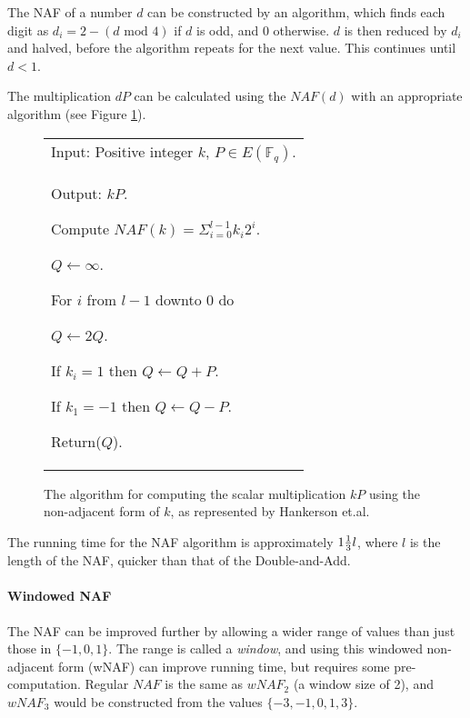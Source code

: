 The NAF of a number \(d\) can be constructed by an algorithm, which finds each digit as \(d_i = 2 - (d \text{ mod } 4)\) if \(d\) is odd, and
\(0\) otherwise. \(d\) is then reduced by \(d_i\) and halved, before the algorithm repeats for the next value. This continues until \(d < 1\).

The multiplication \(dP\) can be calculated using the \(NAF(d)\) with an appropriate algorithm (see Figure \ref{fig:naf-algorithm}).\cite{hankerson2010}

\begin{figure}[htb!]
	\centering
	\begin{tabular}{|p{\textwidth}|}
		\hline
		Input: Positive integer \(k\), \(P \in E(\mathbb{F}_q)\). \\
		Output: \(kP\).

		\begin{enumerate*}
			\item Compute \(NAF(k) = \Sigma^{l-1}_{i=0} k_i2^i\).
			\item \(Q \gets \infty\).
			\item For \(i\) from \(l-1\) downto \(0\) do
			\begin{enumerate*}
				\item \(Q \gets 2Q\).
				\item If \(k_i = 1\) then \(Q \gets Q + P\).
				\item If \(k_1 = -1\) then \(Q \gets Q - P\).
			\end{enumerate*}
			\item Return(\(Q\)).
		\end{enumerate*}
		\\
		\hline
	\end{tabular}
	\caption{The algorithm for computing the scalar multiplication \(kP\) using the non-adjacent form of \(k\), as represented by
		Hankerson et.al.\cite{hankerson2010}}
	\label{fig:naf-algorithm}
\end{figure}

The running time for the NAF algorithm is approximately \(1 {1 \over 3} l\), where \(l\) is the length of the NAF, quicker than that
of the Double-and-Add.\cite{hankerson2010}

\paragraph{Windowed NAF}

The NAF can be improved further by allowing a wider range of values than just those in \(\{-1,0,1\}\). The range is called a \emph{window}, and
using this windowed non-adjacent form (wNAF) can improve running time, but requires some pre-computation. Regular \(NAF\) is the same
as \(wNAF_2\) (a window size of 2), and \(wNAF_3\) would be constructed from the values \(\{-3,-1,0,1,3\}\).

